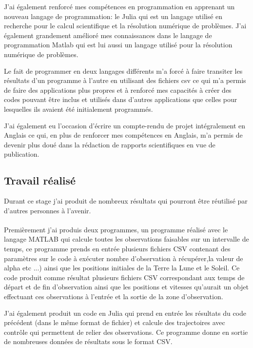 \documentclass[11pt]{article} %
\begin{document}
		J'ai également renforcé mes compétences en programmation en apprenant un nouveau langage de programmation: le Julia qui est un langage utilisé en recherche pour le calcul scientifique et la résolution numérique de problèmes. J'ai également grandement amélioré mes connaissances dans le langage de programmation Matlab qui est lui aussi un langage utilisé pour la résolution numérique de problèmes.
		
		Le fait de programmer en deux langages différents m'a forcé à faire transiter les résultats d'un programme à l'autre en utilisant des fichiers csv ce qui m'a permis de faire des applications plus propres et à renforcé mes capacités à créer des codes pouvant être inclus et utilisés dans d'autres applications que celles pour lesquelles ils avaient été initialement programmés.
		
		J'ai également eu l'occasion d'écrire un compte-rendu de projet intégralement en Anglais ce qui, en plus de renforcer mes compétences en Anglais, m'a permis de devenir plus doué dans la rédaction de rapports scientifiques en vue de publication.
		
		\subsection{Travail réalisé}
		
		Durant ce stage j'ai produit de nombreux résultats qui pourront être réutilisé par d'autres personnes à l'avenir. 
		\\ \\
		Premièrement j'ai produis deux programmes, un programme réalisé avec le langage MATLAB qui calcule toutes les observations faisables sur un intervalle de temps, ce programme prends en entrée plusieurs fichiers CSV contenant des paramètres sur le code à exécuter nombre d'observation à récupérer,la valeur de alpha etc ...) ainsi que les positions initiales de la Terre la Lune et le Soleil. Ce code produit comme résultat plusieurs fichiers CSV correspondant aux temps de départ et de fin d'observation ainsi que les positions et vitesses qu'aurait un objet effectuant ces observations à l'entrée et la sortie de la zone d'observation.
		
		J'ai également produit un code en Julia qui prend en entrée les résultats du code précédent (dans le même format de fichier) et calcule des trajectoires avec contrôle qui permettent de relier des observations. Ce programme donne en sortie de nombreuses données de résultats sous le format CSV.
		
\end{document}
